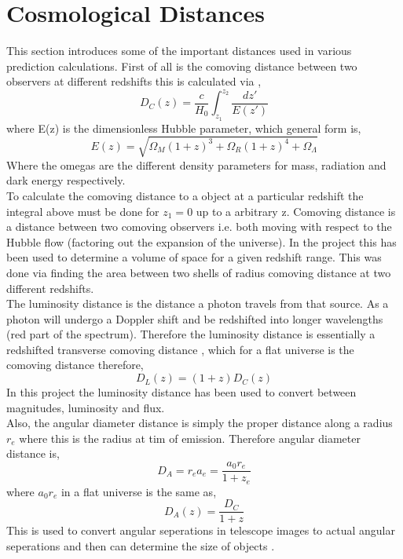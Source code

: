 \documentclass{article}
\begin{document}
\section{Cosmological Distances}
This section introduces some of the important distances used in various prediction calculations. First of all is the comoving distance between two observers at different redshifts this is calculated via \cite{distance_measures_cosmology},
\begin{equation}
D_{C}(z)=\frac{c}{H_{0}}\int^{z_{2}}_{z_{1}}\frac{dz'}{E(z')}
\end{equation}
where E(z) is the dimensionless Hubble parameter, which general form is,
\begin{equation}
E(z)=\sqrt{\Omega_{M}(1+z)^{3}+\Omega_{R}(1+z)^{4}+\Omega_{\Lambda}}
\end{equation}
\indent Where the omegas are the different density parameters for mass, radiation and dark energy respectively.\\
\indent To calculate the comoving distance to a object at a particular redshift the integral above must be done for $z_{1}=0$ up to a arbitrary z. Comoving distance is a distance between two comoving observers i.e. both moving with respect to the Hubble flow (factoring out the expansion of the universe). In the project this has been used to determine a volume of space for a given redshift range. This was done via finding the area between two shells of radius comoving distance at two different redshifts.\\

\indent The luminosity distance is the distance a photon travels from that source. As a photon will undergo a Doppler shift and be redshifted into longer wavelengths (red part of the spectrum). Therefore the luminosity distance is essentially a redshifted transverse comoving distance \cite{distance_measures_cosmology}, which for a flat universe is the comoving distance therefore,
\begin{equation}
D_{L}(z)=(1+z)D_{C}(z)
\end{equation}
In this project the luminosity distance has been used to convert between magnitudes, luminosity and flux.\\

\indent Also, the angular diameter distance is simply the proper distance along a radius $r_{e}$ where this is the radius at tim of emission. Therefore angular diameter distance is,
\begin{equation}
D_{A}=r_{e}a_{e}=\frac{a_{0}r_{e}}{1+z_{e}}
\end{equation}
where $a_{0}r_{e}$ in a flat universe is the same as,
\begin{equation}
D_{A}(z)=\frac{D_{C}}{1+z}
\end{equation}
This is used to convert angular seperations in telescope images to actual angular seperations and then can determine the size of objects \cite{distance_measures_cosmology}.
\end{document}
